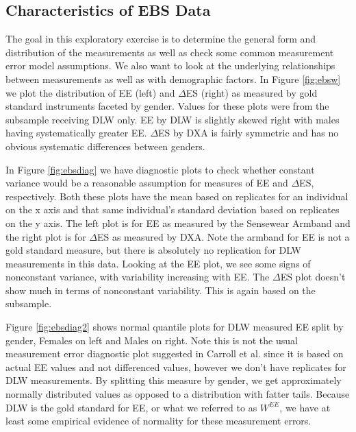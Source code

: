 \documentclass[11pt]{article}\usepackage[]{graphicx}\usepackage[]{color}
\begin{document}
\subsection{Characteristics of EBS Data}

The goal in this exploratory exercise is to determine the general form and distribution of the measurements as well as check some common measurement error model assumptions. We also want to look at the underlying relationships between measurements as well as with demographic factors. In Figure \ref{fig:ebsw} we  plot the distribution of EE (left) and $\Delta$ES (right) as measured by gold standard instruments faceted by gender. Values for these plots were from the subsample receiving DLW only. EE by DLW is slightly skewed right with males having systematically greater EE. $\Delta$ES by DXA is fairly symmetric and has no obvious systematic differences between genders. 

In Figure \ref{fig:ebsdiag} we have diagnostic plots to check whether constant variance would be a reasonable assumption for measures of EE and $\Delta$ES, respectively. Both these plots have the mean based on replicates for an individual on the x axis and that same individual's standard deviation based on replicates on the y axis. The left plot is for EE as measured by the Sensewear Armband and the right plot is for $\Delta$ES as measured by DXA. Note the armband for EE is not a gold standard measure, but there is absolutely no replication for DLW measurements in this data. Looking at the EE plot, we see some signs of nonconstant variance, with variability increasing with EE. The $\Delta$ES plot doesn't show much in terms of nonconstant variability. This is again based on the subsample.

Figure \ref{fig:ebsdiag2} shows normal quantile plots for DLW measured EE split by gender, Females on left and Males on right. Note this is not the usual measurement error diagnostic plot suggested in Carroll et al. \cite{nonlinear} since it is based on actual EE values and not differenced values, however we don't have replicates for DLW measurements. By splitting this measure by gender, we get approximately normally distributed values as opposed to a distribution with fatter tails. Because DLW is the gold standard for EE, or what we referred to as $W^{EE}$, we have at least some empirical evidence of normality for these measurement errors. 
\end{document}
